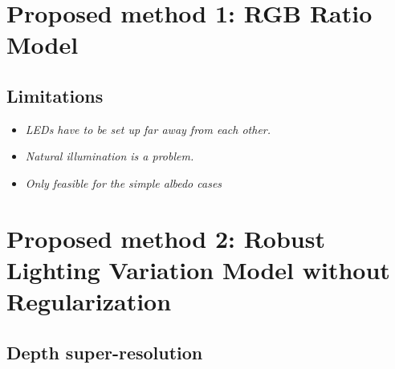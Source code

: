 \section{Proposed method 1: RGB Ratio Model}



\subsection{Limitations}
\begin{itemize}
\item \emph{LEDs have to be set up far away from each other.}
\item \emph{Natural illumination is a problem.}
\item \emph{Only feasible for the simple albedo cases}
\end{itemize}


\section{Proposed method 2: Robust Lighting Variation Model without Regularization}

\subsection{Depth super-resolution}




